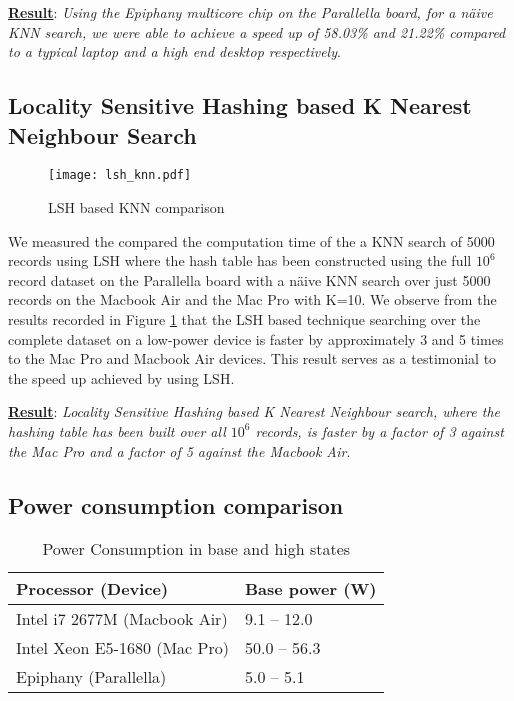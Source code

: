 \textbf{\underline{Result}}: \textit{Using the Epiphany multicore chip on the Parallella board, for a n\"{a}ive KNN search, we were able to achieve a speed up of 58.03\% and 21.22\% compared to a typical laptop and a high end desktop respectively}.

\subsection{Locality Sensitive Hashing based K Nearest Neighbour Search}
\label{subsec:lsh_knn_meas}
\begin{figure}
\centering
\texttt{[image: lsh\_knn.pdf]}
\caption{LSH based KNN comparison}
\label{fig: lsh_knn_fig}
\end{figure}
We measured the compared the computation time of the a KNN search of 5000 records using LSH where the hash table has been constructed using the full $10^6$ record dataset on the Parallella board with a n\"{a}ive KNN search over just 5000 records on the Macbook Air and the Mac Pro with K=10. We observe from the results recorded in Figure \ref{fig: lsh_knn_fig} that the LSH based technique searching over the complete dataset on a low-power device is faster by approximately 3 and 5 times to the Mac Pro and Macbook Air devices. This result serves as a testimonial to the speed up achieved by using LSH.

\textbf{\underline{Result}}: \textit{Locality Sensitive Hashing based K Nearest Neighbour search, where the hashing table has been built over all $10^6$ records, is faster by a factor of 3 against the Mac Pro and a factor of 5 against the Macbook Air}.

\subsection{Power consumption comparison}
\label{subsec:power_cons_comp}
\begin{table}
\caption{Power Consumption in base and high states}
\centering
\begin{tabular}{| l | l |}
\hline
\textbf{Processor (Device)} & \textbf{Base power (W)}\\
\hline
Intel i7 2677M (Macbook Air) & 9.1 -- 12.0\\
\hline
Intel Xeon E5-1680 (Mac Pro) & 50.0 -- 56.3\\
\hline
Epiphany (Parallella) & 5.0 -- 5.1 \\
\hline
\end{tabular}
\label{table:power_states}
\end{table}

